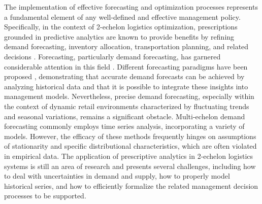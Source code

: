\documentclass[ijoc,sglanonrev]{informs4}
\begin{document}
The implementation of effective forecasting and optimization processes represents a fundamental element of any well-defined and effective management policy. Specifically, in the context of 2-echelon logistics optimization, prescriptions grounded in predictive analytics are known to provide benefits by refining demand forecasting, inventory allocation, transportation planning, and related decisions \citep{VAD12,KK10,A01}. Forecasting, particularly demand forecasting, has garnered considerable attention in this field \citep{Shenstone01}. Different forecasting paradigms have been proposed \citep{Syntetos05,Keneley02,Ma15}, demonstrating that accurate demand forecasts can be achieved by analyzing historical data and that it is possible to integrate these insights into management models. Nevertheless, precise demand forecasting, especially within the context of dynamic retail environments characterized by fluctuating trends and seasonal variations, remains a significant obstacle. Multi-echelon demand forecasting commonly employs time series analysis, incorporating a variety of models.  However, the efficacy of these methods frequently hinges on assumptions of stationarity and specific distributional characteristics, which are often violated in empirical data. 
The application of prescriptive analytics in 2-echelon logistics systems is still an area of research and presents several challenges, including how to deal with uncertainties in demand and supply, how to properly model historical series, and how to efficiently formalize the related management decision processes to be supported. 



\end{document}
